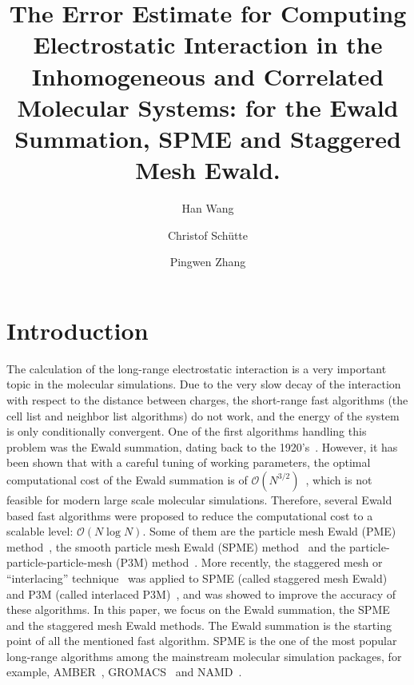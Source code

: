 \documentclass[aps,pre,preprint]{revtex4}
\begin{document}
\title{The Error Estimate for Computing Electrostatic Interaction
  in the Inhomogeneous and Correlated Molecular Systems:
  for the Ewald Summation, SPME and Staggered Mesh Ewald.
}
\author{Han Wang}
\author{Christof Sch\"utte}
\author{Pingwen Zhang}

\begin{abstract}
  
\end{abstract}

\maketitle

\section{Introduction}

The calculation of the long-range electrostatic interaction is a very
important topic in the molecular simulations.  Due to the very slow
decay of the interaction with respect to the distance between charges,
the short-range fast algorithms (the cell list and neighbor list
algorithms) do not work, and the
energy of the system is only conditionally convergent.  One of the
first algorithms handling this problem was the Ewald summation, dating
back to the 1920's~\cite{ewald1921die}.  However, it has been shown that
with a careful tuning of working parameters, the optimal computational
cost of the Ewald summation is of $\mathcal
O(N^{3/2})$~\cite{perram1988asc}, which is not feasible for modern
large scale molecular simulations.
Therefore, several Ewald based fast algorithms were proposed to reduce the
computational cost to a scalable level: $\mathcal O(N\log N)$. Some of them
are
the particle mesh Ewald (PME)
method~\cite{darden1993pme}, the smooth particle mesh Ewald (SPME)
method~\cite{essmann1995spm} and the particle-particle-particle-mesh
(P3M) method~\cite{hockney1988computer, deserno1998mue1}.
More recently, the staggered mesh or
``interlacing'' technique~\cite{chen1974reduction,eastwood1976optimal}
was applied to SPME
(called staggered mesh Ewald)~\cite{cerutti2009staggered} and P3M
(called interlaced P3M)~\cite{neelov2010interlaced}, and was showed to
improve the accuracy of these algorithms.
In this paper, we focus on the Ewald summation, the SPME and
the staggered mesh Ewald methods. The Ewald summation is the starting
point of all the mentioned fast algorithm. SPME
is the one of the most popular long-range algorithms among
the mainstream molecular simulation packages, for example,
AMBER~\cite{case2005amber}, GROMACS~\cite{van2005gromacs,
  hess2008gromacs} and NAMD~\cite{phillips2005scalable}.
\end{document}
